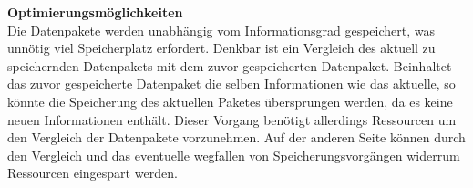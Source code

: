 \textbf{Optimierungsmöglichkeiten}\\
Die Datenpakete werden unabhängig vom Informationsgrad gespeichert, was unnötig viel Speicherplatz erfordert. Denkbar ist ein Vergleich des aktuell zu speichernden Datenpakets mit dem zuvor gespeicherten Datenpaket. Beinhaltet das zuvor gespeicherte Datenpaket die selben Informationen wie das aktuelle, so könnte die Speicherung des aktuellen Paketes übersprungen werden, da es keine neuen Informationen enthält. Dieser Vorgang benötigt allerdings Ressourcen um den Vergleich der Datenpakete vorzunehmen. Auf der anderen Seite können durch den Vergleich und das eventuelle wegfallen von Speicherungsvorgängen widerrum Ressourcen eingespart werden. 